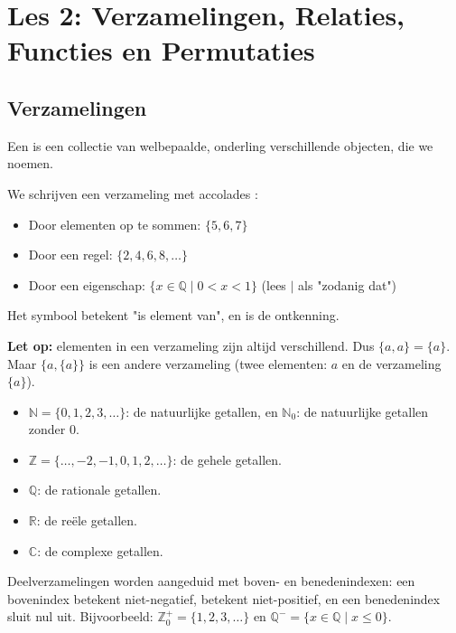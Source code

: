 \section{Les 2: Verzamelingen, Relaties, Functies en Permutaties}

\subsection{Verzamelingen}

Een  is een collectie van welbepaalde, onderling verschillende objecten, die we  noemen.


We schrijven een verzameling met accolades \inlinecode{\{\dots\}}:
\begin{itemize}
    \item Door elementen op te sommen: $\{5, 6, 7\}$
    \item Door een regel: $\{2, 4, 6, 8, \dots\}$
    \item Door een eigenschap: $\{x \in \mathbb{Q} \mid 0 < x < 1\}$ (lees $\mid$ als "zodanig dat")
\end{itemize}

Het symbool \inlinetext{$\in$} betekent "is element van", en \inlinetext{$\notin$} is de ontkenning.

\textbf{Let op:} elementen in een verzameling zijn altijd verschillend. Dus $\{a, a\} = \{a\}$. Maar $\{a, \{a\}\}$ is een andere verzameling (twee elementen: $a$ en de verzameling $\{a\}$).


\begin{itemize}
    \item $\mathbb{N} = \{0, 1, 2, 3, \dots\}$: de natuurlijke getallen, en $\mathbb{N}_0$: de natuurlijke getallen zonder $0$.
    \item $\mathbb{Z} = \{\dots, -2, -1, 0, 1, 2, \dots\}$: de gehele getallen.
    \item $\mathbb{Q}$: de rationale getallen.
    \item $\mathbb{R}$: de reële getallen.
    \item $\mathbb{C}$: de complexe getallen.
\end{itemize}

Deelverzamelingen worden aangeduid met boven- en benedenindexen: een bovenindex \inlinetext{$+$} betekent niet-negatief, \inlinetext{$-$} betekent niet-positief, en een benedenindex  sluit nul uit. \newline
Bijvoorbeeld: $\mathbb{Z}_0^{+} = \{1, 2, 3, \dots\}$ en $\mathbb{Q}^{-} = \{x \in \mathbb{Q} \mid x \leq 0\}$.

